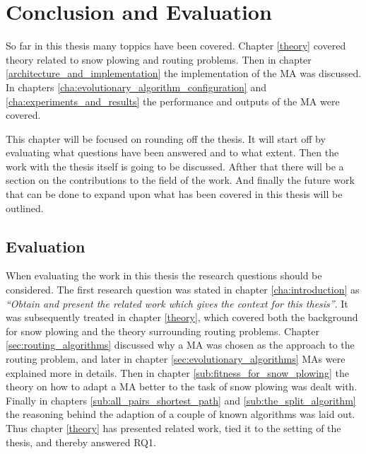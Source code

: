 \chapter{Conclusion and Evaluation}

So far in this thesis many toppics have been covered. Chapter \ref{theory} covered theory related to snow plowing and routing problems. Then in chapter \ref{architecture_and_implementation} the implementation of the MA was discussed. In chapters \ref{cha:evolutionary_algorithm_configuration} and \ref{cha:experiments_and_results} the performance and outputs of the MA were covered.

This chapter will be focused on rounding off the thesis. It will start off by evaluating what questions have been answered and to what extent. Then the work with the thesis itself is going to be discussed. Afther that there will be a section on the contributions to the field of the work. And finally the future work that can be done to expand upon what has been covered in this thesis will be outlined.

\section{Evaluation}

When evaluating the work in this thesis the research questions should be considered. The first research question was stated in chapter \ref{cha:introduction} as \emph{\enquote{Obtain and present the related work which gives the context for this thesis}}. It was subsequently treated in chapter \ref{theory}, which covered both the background for snow plowing and the theory surrounding routing problems. Chapter \ref{sec:routing_algorithms} discussed why a MA was chosen as the approach to the routing problem, and later in chapter \ref{sec:evolutionary_algorithms} MAs were explained more in details. Then in chapter \ref{sub:fitness_for_snow_plowing} the theory on how to adapt a MA better to the task of snow plowing was dealt with. Finally in chapters \ref{sub:all_pairs_shortest_path} and \ref{sub:the_split_algorithm} the reasoning behind the adaption of a couple of known algorithms was laid out. Thus chapter \ref{theory} has presented related work, tied it to the setting of the thesis, and thereby answered RQ1.


